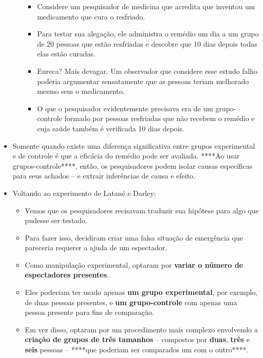 \documentclass[
]{book}
\providecommand{\tightlist}{%
  \setlength{\itemsep}{0pt}\setlength{\parskip}{0pt}}
\begin{document}
\begin{itemize}
\begin{itemize}
    \begin{itemize}
    \tightlist
    \item
      Considere um pesquisador de medicina que acredita que inventou um
      medicamento que cura o resfriado.
    \item
      Para testar sua alegação, ele administra o remédio um dia a um
      grupo de 20 pessoas que estão resfriadas e descobre que 10 dias
      depois todas elas estão curadas.
    \item
      Eureca? Mais devagar. Um observador que considere esse estudo
      falho poderia argumentar sensatamente que as pessoas teriam
      melhorado mesmo sem o medicamento.
    \item
      O que o pesquisador evidentemente precisava era de um
      grupo-controle formado por pessoas resfriadas que não recebem o
      remédio e cuja saúde também é verificada 10 dias depois.
    \end{itemize}
  \end{itemize}
\item
  Somente quando existe uma diferença significativa entre grupos
  experimental e de controle é que a eficácia do remédio pode ser
  avaliada. ****Ao usar grupos-controle****, então, os pesquisadores
  podem isolar causas específicas para seus achados -- e extrair
  inferências de causa e efeito.
\item
  Voltando ao experimento de Latané e Darley:

  \begin{itemize}
  \tightlist
  \item
    Vemos que os pesquisadores recisavam traduzir sua hipótese para algo
    que pudesse ser testado.
  \item
    Para fazer isso, decidiram criar uma falsa situação de emergência
    que pareceria requerer a ajuda de um espectador.
  \item
    Como manipulação experimental, optaram por \textbf{variar o número
    de espectadores presentes}.
  \item
    Eles poderiam ter usado apenas \textbf{um grupo experimental}, por
    exemplo, de duas pessoas presentes, e \textbf{um grupo-controle} com
    apenas uma pessoa presente para fins de comparação.
  \item
    Em vez disso, optaram por um procedimento mais complexo envolvendo a
    \textbf{criação de grupos de três tamanhos} -- compostos por
    \textbf{duas}, \textbf{três} e \textbf{seis} pessoas -- ****que
    poderiam ser comparados um com o outro****.
  \end{itemize}
\end{itemize}
\end{document}
